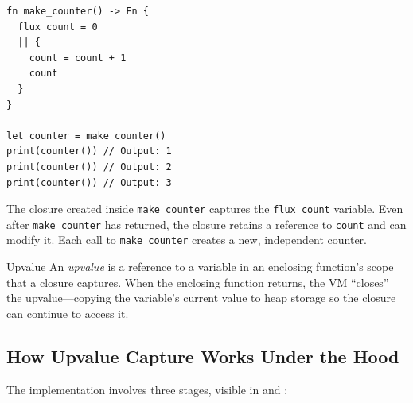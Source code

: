 \begin{lstlisting}[language=Lattice, caption={Closures capture enclosing variables}]
fn make_counter() -> Fn {
  flux count = 0
  || {
    count = count + 1
    count
  }
}

let counter = make_counter()
print(counter()) // Output: 1
print(counter()) // Output: 2
print(counter()) // Output: 3
\end{lstlisting}

The closure created inside \lstinline|make_counter| captures the \lstinline|flux count| variable. Even after \lstinline|make_counter| has returned, the closure retains a reference to \lstinline|count| and can modify it. Each call to \lstinline|make_counter| creates a new, independent counter.

\begin{defnbox}{Upvalue}
An \emph{upvalue} is a reference to a variable in an enclosing function's scope that a closure captures. When the enclosing function returns, the VM ``closes'' the upvalue---copying the variable's current value to heap storage so the closure can continue to access it.
\end{defnbox}

\subsection{How Upvalue Capture Works Under the Hood}\label{sec:upvalue-internals}

The implementation involves three stages, visible in  and :

